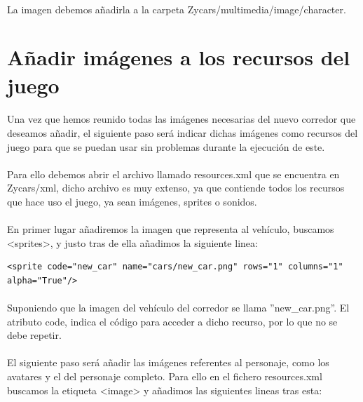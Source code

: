 \paragraph{}
La imagen debemos añadirla a la carpeta Zycars/multimedia/image/character.

\section{Añadir imágenes a los recursos del juego}

\paragraph{}
Una vez que hemos reunido todas las imágenes necesarias del nuevo corredor que deseamos añadir, el siguiente paso será indicar
dichas imágenes como recursos del juego para que se puedan usar sin problemas durante la ejecución de este.

\paragraph{}
Para ello debemos abrir el archivo llamado resources.xml que se encuentra en Zycars/xml, dicho archivo es muy extenso, ya que 
contiende todos los recursos que hace uso el juego, ya sean imágenes, sprites o sonidos.

\paragraph{}
En primer lugar añadiremos la imagen que representa al vehículo, buscamos <sprites>, y justo tras de ella añadimos la siguiente 
linea:

\begin{lstlisting}[style=XML]
<sprite code="new_car" name="cars/new_car.png" rows="1" columns="1" alpha="True"/>
\end{lstlisting}

\paragraph{}
Suponiendo que la imagen del vehículo del corredor se llama ''new\_car.png''. El atributo code, indica el código para acceder a 
dicho recurso, por lo que no se debe repetir.

\paragraph{}
El siguiente paso será añadir las imágenes referentes al personaje, como los avatares y el del personaje completo. Para ello en el 
fichero resources.xml buscamos la etiqueta <image> y añadimos las siguientes lineas tras esta:

